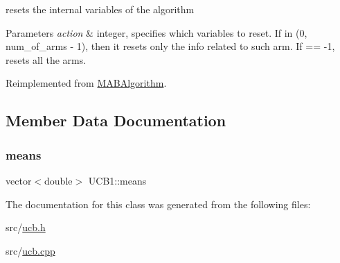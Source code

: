 resets the internal variables of the algorithm 


\begin{DoxyParams}{Parameters}
{\em action} & integer, specifies which variables to reset. If in (0, num\+\_\+of\+\_\+arms -\/ 1), then it resets only the info related to such arm. If == -\/1, resets all the arms. \\
\hline
\end{DoxyParams}


Reimplemented from \mbox{\hyperlink{class_m_a_b_algorithm_ad5761cee0b0e3421d1f043dbcc0b5f85}{M\+A\+B\+Algorithm}}.



\subsection{Member Data Documentation}
\mbox{\label{class_u_c_b1_ad183f1a1841c9bcb54a82c7b92503a14}} 
\subsubsection{\texorpdfstring{means}{means}}
{\footnotesize\ttfamily vector$<$double$>$ U\+C\+B1\+::means}



The documentation for this class was generated from the following files\+:\begin{DoxyCompactItemize}
\item 
src/\mbox{\hyperlink{ucb_8h}{ucb.\+h}}\item 
src/\mbox{\hyperlink{ucb_8cpp}{ucb.\+cpp}}\end{DoxyCompactItemize}
